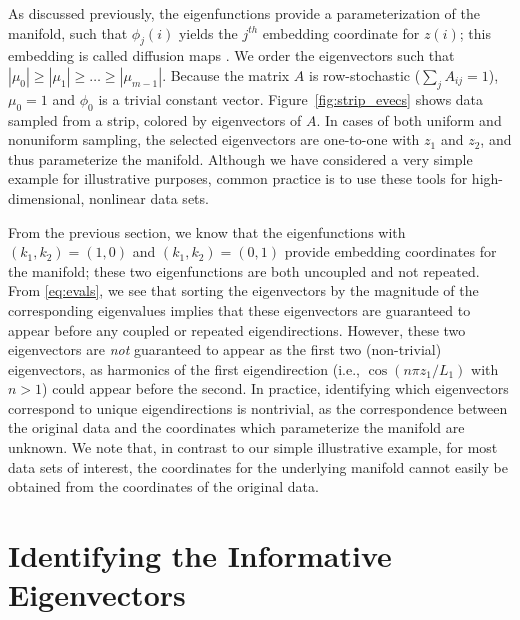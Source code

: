 \documentclass[preprint]{elsarticle}
\begin{document}
As discussed previously, the eigenfunctions provide a parameterization of the manifold, such that $\phi_{j}(i)$ yields the $j^{th}$ embedding coordinate for $z(i)$; this embedding is called diffusion maps \cite{...}.
%
We order the eigenvectors such that $|\mu_0| \ge |\mu_1| \ge \dots \ge |\mu_{m-1}|$.%
%
Because the matrix $A$ is row-stochastic ($\sum_j A_{ij} = 1$),  $\mu_0 = 1$ and $\phi_0$ is a trivial constant vector.
%
Figure~\ref{fig:strip_evecs} shows data sampled from a strip, colored by eigenvectors of $A$. 
%
In cases of both uniform and nonuniform sampling, the selected eigenvectors are one-to-one with $z_1$ and $z_2$, and thus parameterize the manifold. 
%
Although we have considered a very simple example for illustrative purposes, common practice is to use these tools for high-dimensional, nonlinear data sets.

From the previous section, we know that the eigenfunctions with $(k_1, k_2) =(1, 0)$ and $(k_1, k_2) =(0, 1)$ provide embedding coordinates for the manifold; these two eigenfunctions are both uncoupled and not repeated.  
%
From \eqref{eq:evals}, we see that sorting the eigenvectors by the magnitude of the corresponding eigenvalues implies that these eigenvectors are guaranteed to appear before any coupled or repeated eigendirections. 
%
However, these two eigenvectors are {\em not} guaranteed to appear as the first two (non-trivial) eigenvectors, as harmonics of the first eigendirection (i.e., $\cos \left( n \pi z_1 / L_1 \right)$ with $n > 1$) could appear before the second.
%
In practice, identifying which eigenvectors correspond to unique eigendirections is nontrivial, as the correspondence between the original data and the coordinates which parameterize the manifold are unknown.
%
We note that, in contrast to our simple illustrative example, for most data sets of interest, the coordinates for the underlying manifold cannot easily be obtained from the coordinates of the original data. 

\section{Identifying the Informative Eigenvectors }
\end{document}
